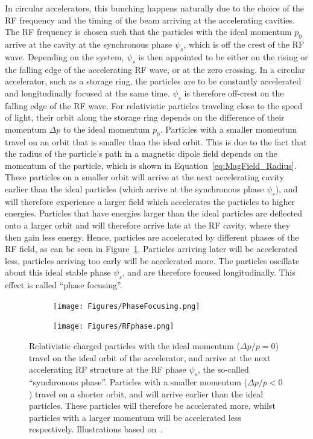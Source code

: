 In circular accelerators, this bunching happens naturally due to the choice of the RF frequency and the timing of the beam arriving at the accelerating cavities.
The RF frequency is chosen such that the particles with the ideal momentum $p_0$ arrive at the cavity at the synchronous phase $\psi_s$, which is off the crest of the RF wave.
Depending on the system,  $\psi_s$ is then appointed to be either on the rising or the falling edge of the accelerating RF wave, or at the zero crossing.
In a circular accelerator, such as a storage ring, the particles are to be constantly accelerated and longitudinally focused at the same time.
$\psi_s$ is therefore off-crest on the falling edge of the RF wave.
For relativistic particles traveling close to the speed of light, their orbit along the storage ring depends on the difference of their momentum $\Delta p$ to the ideal momentum $p_0$.
Particles with a smaller momentum travel on an orbit that is smaller than the ideal orbit.
This is due to the fact that the radius of the particle's path in a magnetic dipole field depends on the momentum of the particle, which is shown in Equation~\ref{eq:MagField_Radius}.
These particles on a smaller orbit will arrive at the next accelerating cavity earlier than the ideal particles (which arrive at the synchronous phase $\psi_s$), and will therefore experience a larger field which accelerates the particles to higher energies.
Particles that have energies larger than the ideal particles are deflected onto a larger orbit and will therefore arrive late at the RF cavity, where they then gain less energy. 
Hence, particles are accelerated by different phases of the RF field, as can be seen in Figure~\ref{fig:RFPhase}.
Particles arriving later will be accelerated less, particles arriving too early will be accelerated more.
The particles oscillate about this ideal stable phase $\psi_s$, and are therefore focused longitudinally.
This effect is called ``phase focusing''.
\begin{figure}
\begin{subfigure}[b]{0.4\textwidth}
\centering
 \texttt{[image: Figures/PhaseFocusing.png]}
\end{subfigure}\hfill
\begin{subfigure}[b]{0.49\textwidth}
\centering
 \texttt{[image: Figures/RFphase.png]}
\end{subfigure}
\caption[Illustrations explaining ``phase focusing'']{Relativistic charged particles with the ideal momentum ($\Delta p/p = 0$) travel on the ideal orbit of the accelerator, and arrive at the next accelerating RF structure at the RF phase $\psi_s$, the so-called ``synchronous phase''. 
Particles with a smaller momentum ($\Delta p/p < 0$) travel on a shorter orbit, and will arrive earlier than the ideal particles.
These particles will therefore be accelerated more, whilst particles with a larger momentum will be accelerated less respectively.
Illustrations based on~\cite{Anke}.}
\label{fig:RFPhase}
\end{figure}

